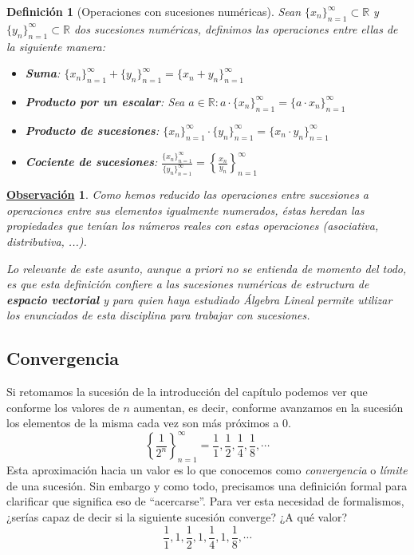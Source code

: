 \documentclass[10pt,a4paper,openright]{book}
\theoremstyle{break}
\newtheorem{defi}{Definición}[chapter]
\newtheorem{obs}{\underline{Observación}}[chapter]
\begin{document}
\begin{defi}[Operaciones con sucesiones numéricas]
Sean $\{x_n\}_{n=1}^{\infty}\subset \mathbb R$ y $\{y_n\}_{n=1}^{\infty}\subset \mathbb R$ dos sucesiones numéricas, definimos las operaciones entre ellas de la siguiente manera:
\begin{itemize}
\item \textbf{Suma}: $\{x_n\}_{n=1}^{\infty}+\{y_n\}_{n=1}^{\infty}=\{x_n+y_n\}_{n=1}^{\infty}$

\item \textbf{Producto por un escalar}: Sea $a\in \mathbb R: a\cdot \{x_n\}_{n=1}^{\infty}=\{a\cdot x_n\}_{n=1}^{\infty}$

\item \textbf{Producto de sucesiones}: $\{x_n\}_{n=1}^{\infty}\cdot \{y_n\}_{n=1}^{\infty}=\{x_n\cdot y_n\}_{n=1}^{\infty}$

\item \textbf{Cociente de sucesiones}: $\frac{\{x_n\}_{n=1}^{\infty}}{\{y_n\}_{n=1}^{\infty}}=\left\lbrace\frac{x_n}{y_n}\right\rbrace_{n=1}^{\infty}$
\end{itemize}
\end{defi}

\begin{obs}
Como hemos reducido las operaciones entre sucesiones a operaciones entre sus elementos igualmente numerados, éstas heredan las propiedades que tenían los números reales con estas operaciones (asociativa, distributiva, ...).

Lo relevante de este asunto, aunque a priori no se entienda de momento del todo, es que esta definición confiere a las sucesiones numéricas de estructura de \textbf{espacio vectorial} y para quien haya estudiado Álgebra Lineal permite utilizar los enunciados de esta disciplina para trabajar con sucesiones.
\end{obs}

\subsection{Convergencia}
\label{subsec:convergencia}
Si retomamos la sucesión de la introducción del capítulo podemos ver que conforme los valores de $n$ aumentan, es decir, conforme avanzamos en la sucesión los elementos de la misma cada vez son más próximos a 0.
\[
\left\lbrace\frac{1}{2^n}\right\rbrace_{n=1}^{\infty} = \frac{1}{1}, \frac{1}{2}, \frac{1}{4}, \frac{1}{8}, \cdots
\]
Esta aproximación hacia un valor es lo que conocemos como \textit{convergencia} o \textit{límite} de una sucesión. Sin embargo y como todo, precisamos una definición formal para clarificar que significa eso de ``acercarse''. Para ver esta necesidad de formalismos, ¿serías capaz de decir si la siguiente sucesión converge? ¿A qué valor?
\[
\frac{1}{1}, 1, \frac{1}{2}, 1, \frac{1}{4}, 1, \frac{1}{8}, \cdots
\]
\end{document}

